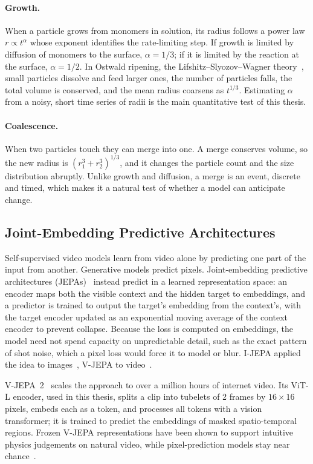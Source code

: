 \paragraph{Growth.} When a particle grows from monomers in solution, its radius follows a
power law $r \propto t^{\alpha}$ whose exponent identifies the rate-limiting step. If
growth is limited by diffusion of monomers to the surface, $\alpha = 1/3$; if it is limited
by the reaction at the surface, $\alpha = 1/2$. In Ostwald ripening, the
Lifshitz--Slyozov--Wagner theory~\cite{lifshitz1961,wagner1961}, small particles dissolve and
feed larger ones, the number of particles falls, the total volume is conserved, and the
mean radius coarsens as $t^{1/3}$. Estimating $\alpha$ from a noisy, short time series
of radii is the main quantitative test of this thesis.

\paragraph{Coalescence.} When two particles touch they can merge into one. A merge
conserves volume, so the new radius is $(r_1^3 + r_2^3)^{1/3}$, and it changes the
particle count and the size distribution abruptly. Unlike growth and diffusion, a merge
is an event, discrete and timed, which makes it a natural test of whether a model can
anticipate change.

\subsection{Joint-Embedding Predictive Architectures}
\label{sec:jepa}

Self-supervised video models learn from video alone by predicting one part of the input
from another. Generative models predict pixels. Joint-embedding predictive
architectures (JEPAs)~\cite{lecun2022path} instead predict in a learned representation
space: an encoder maps both the visible context and the hidden target to embeddings,
and a predictor is trained to output the target's embedding from the context's, with
the target encoder updated as an exponential moving average of the context encoder to
prevent collapse. Because the loss is computed on embeddings, the model need not spend
capacity on unpredictable detail, such as the exact pattern of shot noise, which a pixel
loss would force it to model or blur. I-JEPA applied the idea to images~\cite{ijepa},
V-JEPA to video~\cite{vjepa}.

V-JEPA~2~\cite{assran2025vjepa2} scales the approach to over a million hours of
internet video. Its ViT-L encoder, used in this thesis, splits a clip into tubelets of 2
frames by $16 \times 16$ pixels, embeds each as a token, and processes all tokens with a
vision transformer; it is trained to predict the embeddings of masked spatio-temporal
regions. Frozen V-JEPA representations have been shown to support intuitive physics
judgements on natural video, while pixel-prediction models stay near
chance~\cite{garrido2025intuitive}.

